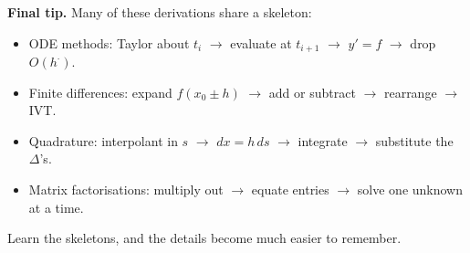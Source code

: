 \vspace{8pt}
\begin{tcolorbox}[enhanced,colback=accentlight,colframe=accent!50,boxrule=0.5pt,arc=2pt]
\textbf{Final tip.} Many of these derivations share a skeleton:
\begin{itemize}[leftmargin=16pt,itemsep=1pt]
\item ODE methods: Taylor about $t_i$ $\to$ evaluate at $t_{i+1}$ $\to$ $y'=f$ $\to$ drop $O(h^{\cdot})$.
\item Finite differences: expand $f(x_0\pm h)$ $\to$ add or subtract $\to$ rearrange $\to$ IVT.
\item Quadrature: interpolant in $s$ $\to$ $dx=h\,ds$ $\to$ integrate $\to$ substitute the $\Delta$'s.
\item Matrix factorisations: multiply out $\to$ equate entries $\to$ solve one unknown at a time.
\end{itemize}
Learn the skeletons, and the details become much easier to remember.
\end{tcolorbox}
